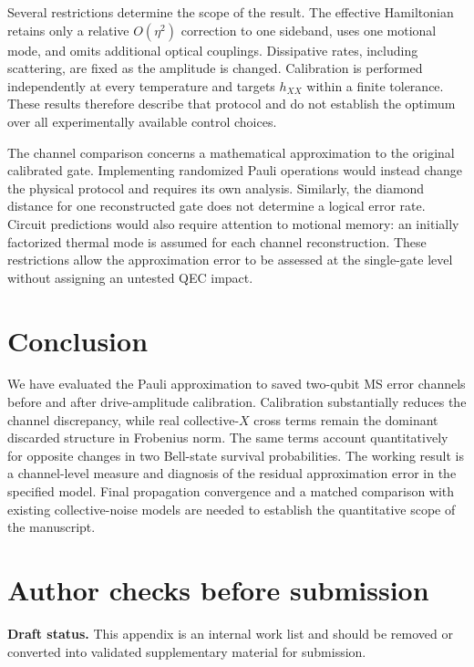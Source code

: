 \documentclass[a4paper,11pt]{article}
\newcommand{\draftnote}[1]{\par\smallskip\noindent
  {\color{blue!55!black}\textbf{Draft status.} #1}\par\smallskip}
\begin{document}
Several restrictions determine the scope of the result. The effective
Hamiltonian retains only a relative $O(\eta^2)$ correction to one
sideband, uses one motional mode, and omits additional optical
couplings. Dissipative rates, including scattering, are fixed as
the amplitude is changed. Calibration is performed independently
at every temperature and targets $h_{XX}$ within a finite tolerance.
These results therefore describe that protocol and do not establish
the optimum over all experimentally available control choices.

The channel comparison concerns a mathematical approximation to the
original calibrated gate. Implementing randomized Pauli operations
would instead change the physical protocol and requires its own
analysis. Similarly, the diamond distance for one reconstructed
gate does not determine a logical error rate. Circuit predictions
would also require attention to motional memory: an initially
factorized thermal mode is assumed for each channel reconstruction.
These restrictions allow the approximation error to be assessed
at the single-gate level without assigning an untested QEC impact.

\section{Conclusion}

We have evaluated the Pauli approximation to saved two-qubit MS
error channels before and after drive-amplitude calibration.
Calibration substantially reduces the channel discrepancy, while
real collective-$X$ cross terms remain the dominant discarded
structure in Frobenius norm. The same terms account quantitatively
for opposite changes in two Bell-state survival probabilities.
The working result is a channel-level measure and diagnosis of
the residual approximation error in the specified model.
Final propagation convergence and a matched comparison with
existing collective-noise models are needed to establish the
quantitative scope of the manuscript.

\appendix
\section{Author checks before submission}
\label{sec:author_checks}

\draftnote{This appendix is an internal work list and should be removed
or converted into validated supplementary material for submission.}
\end{document}
